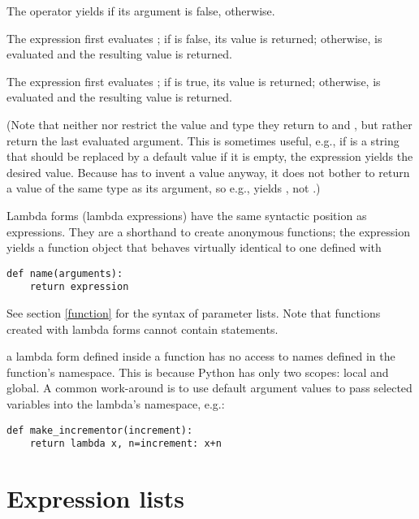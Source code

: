 The operator  yields  if its argument is false,
 otherwise.

The expression  first evaluates ; if
 is false, its value is returned; otherwise,  is
evaluated and the resulting value is returned.

The expression  first evaluates ; if
 is true, its value is returned; otherwise,  is
evaluated and the resulting value is returned.

(Note that neither  nor  restrict the value
and type they return to  and , but rather return the
last evaluated argument.
This is sometimes useful, e.g., if  is a string that should be
replaced by a default value if it is empty, the expression
 yields the desired value.  Because  has to
invent a value anyway, it does not bother to return a value of the
same type as its argument, so e.g.,  yields ,
not .)

Lambda forms (lambda expressions) have the same syntactic position as
expressions.  They are a shorthand to create anonymous functions; the
expression 
yields a function object that behaves virtually identical to one
defined with

\begin{verbatim}
def name(arguments):
    return expression
\end{verbatim}

See section \ref{function} for the syntax of parameter lists.  Note
that functions created with lambda forms cannot contain statements.
\label{lambda}

 a lambda form defined inside a function
has no access to names defined in the function's namespace.  This is
because Python has only two scopes: local and global.  A common
work-around is to use default argument values to pass selected
variables into the lambda's namespace, e.g.:

\begin{verbatim}
def make_incrementor(increment):
    return lambda x, n=increment: x+n
\end{verbatim}

\section{Expression lists\label{exprlists}}

